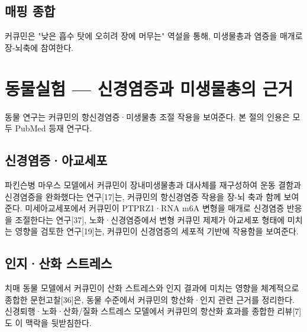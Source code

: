 \documentclass[11pt,oneside]{book}
\begin{document}
\subsection{매핑 종합}
\vspace{2pt}\vspace{3pt}

커큐민은 "낮은 흡수 탓에 오히려 장에 머무는" 역설을 통해, 미생물총과 염증을 매개로 장-뇌축에 참여한다.

\section{동물실험 — 신경염증과 미생물총의 근거}
동물 연구는 커큐민의 항신경염증·미생물총 조절 작용을 보여준다. 본 절의 인용은 모두 PubMed 등재 연구다.

\subsection{신경염증·아교세포}
파킨슨병 마우스 모델에서 커큐민이 장내미생물총과 대사체를 재구성하여 운동 결함과 신경염증을 완화했다는 연구[17]는, 커큐민의 항신경염증 작용을 장-뇌 축과 함께 보여준다. 미세아교세포에서 커큐민이 PTPRZ1·RNA m6A 변형을 매개로 신경염증 반응을 조절한다는 연구[37], 노화·신경염증에서 변형 커큐민 제제가 아교세포 형태에 미치는 영향을 검토한 연구[19]는, 커큐민이 신경염증의 세포적 기반에 작용함을 보여준다.

\subsection{인지·산화 스트레스}
치매 동물 모델에서 커큐민이 산화 스트레스와 인지 결과에 미치는 영향을 체계적으로 종합한 문헌고찰[36]은, 동물 수준에서 커큐민의 항산화·인지 관련 근거를 정리한다. 신경퇴행·노화·산화/질화 스트레스 모델에서 커큐민의 항산화 효과를 종합한 리뷰[7]도 이 맥락을 뒷받침한다.
\end{document}
